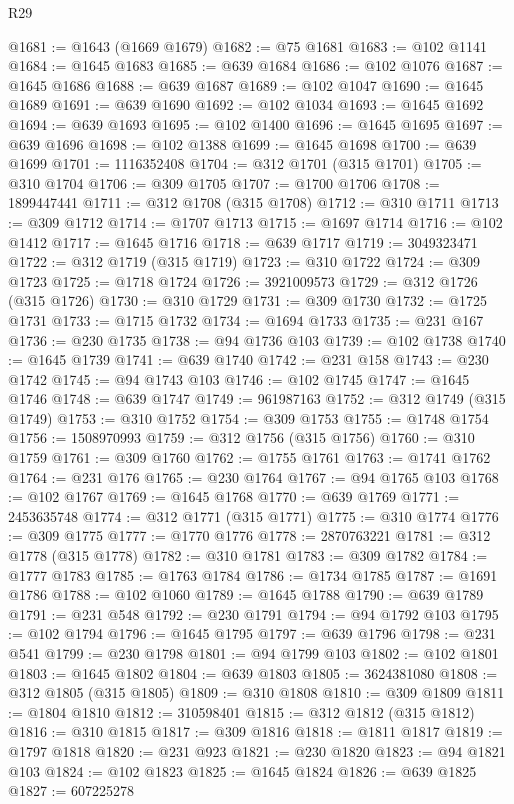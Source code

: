 \begin{lexlean}{R29}
\begin{coremodule}
@1681 := @1643 (@1669 @1679)
@1682 := @75 @1681
@1683 := @102 @1141
@1684 := @1645 @1683
@1685 := @639 @1684
@1686 := @102 @1076
@1687 := @1645 @1686
@1688 := @639 @1687
@1689 := @102 @1047
@1690 := @1645 @1689
@1691 := @639 @1690
@1692 := @102 @1034
@1693 := @1645 @1692
@1694 := @639 @1693
@1695 := @102 @1400
@1696 := @1645 @1695
@1697 := @639 @1696
@1698 := @102 @1388
@1699 := @1645 @1698
@1700 := @639 @1699
@1701 := 1116352408
@1704 := @312 @1701 (@315 @1701)
@1705 := @310 @1704
@1706 := @309 @1705
@1707 := @1700 @1706
@1708 := 1899447441
@1711 := @312 @1708 (@315 @1708)
@1712 := @310 @1711
@1713 := @309 @1712
@1714 := @1707 @1713
@1715 := @1697 @1714
@1716 := @102 @1412
@1717 := @1645 @1716
@1718 := @639 @1717
@1719 := 3049323471
@1722 := @312 @1719 (@315 @1719)
@1723 := @310 @1722
@1724 := @309 @1723
@1725 := @1718 @1724
@1726 := 3921009573
@1729 := @312 @1726 (@315 @1726)
@1730 := @310 @1729
@1731 := @309 @1730
@1732 := @1725 @1731
@1733 := @1715 @1732
@1734 := @1694 @1733
@1735 := @231 @167
@1736 := @230 @1735
@1738 := @94 @1736 @103
@1739 := @102 @1738
@1740 := @1645 @1739
@1741 := @639 @1740
@1742 := @231 @158
@1743 := @230 @1742
@1745 := @94 @1743 @103
@1746 := @102 @1745
@1747 := @1645 @1746
@1748 := @639 @1747
@1749 := 961987163
@1752 := @312 @1749 (@315 @1749)
@1753 := @310 @1752
@1754 := @309 @1753
@1755 := @1748 @1754
@1756 := 1508970993
@1759 := @312 @1756 (@315 @1756)
@1760 := @310 @1759
@1761 := @309 @1760
@1762 := @1755 @1761
@1763 := @1741 @1762
@1764 := @231 @176
@1765 := @230 @1764
@1767 := @94 @1765 @103
@1768 := @102 @1767
@1769 := @1645 @1768
@1770 := @639 @1769
@1771 := 2453635748
@1774 := @312 @1771 (@315 @1771)
@1775 := @310 @1774
@1776 := @309 @1775
@1777 := @1770 @1776
@1778 := 2870763221
@1781 := @312 @1778 (@315 @1778)
@1782 := @310 @1781
@1783 := @309 @1782
@1784 := @1777 @1783
@1785 := @1763 @1784
@1786 := @1734 @1785
@1787 := @1691 @1786
@1788 := @102 @1060
@1789 := @1645 @1788
@1790 := @639 @1789
@1791 := @231 @548
@1792 := @230 @1791
@1794 := @94 @1792 @103
@1795 := @102 @1794
@1796 := @1645 @1795
@1797 := @639 @1796
@1798 := @231 @541
@1799 := @230 @1798
@1801 := @94 @1799 @103
@1802 := @102 @1801
@1803 := @1645 @1802
@1804 := @639 @1803
@1805 := 3624381080
@1808 := @312 @1805 (@315 @1805)
@1809 := @310 @1808
@1810 := @309 @1809
@1811 := @1804 @1810
@1812 := 310598401
@1815 := @312 @1812 (@315 @1812)
@1816 := @310 @1815
@1817 := @309 @1816
@1818 := @1811 @1817
@1819 := @1797 @1818
@1820 := @231 @923
@1821 := @230 @1820
@1823 := @94 @1821 @103
@1824 := @102 @1823
@1825 := @1645 @1824
@1826 := @639 @1825
@1827 := 607225278

\end{coremodule}
\end{lexlean}
